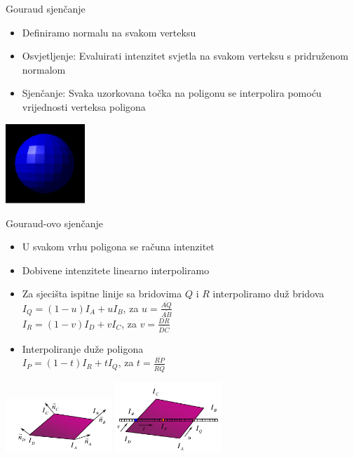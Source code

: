 \documentclass[9pt]{beamer}
\begin{document}
\begin{frame}{Gouraud sjenčanje}
	\begin{itemize}%
		\item Definiramo normalu na svakom verteksu
		\item Osvjetljenje: Evaluirati intenzitet svjetla na svakom verteksu s pridruženom normalom
		\item Sjenčanje: Svaka uzorkovana točka na poligonu se interpolira pomoću vrijednosti verteksa poligona
	\end{itemize}
	\begin{center}
		\includegraphics[width=3cm]{slike/shade_vs_light_01.png}
	\end{center}
\end{frame}
\begin{frame}{Gouraud-ovo sjenčanje}
	\begin{itemize}%
		\item U svakom vrhu poligona se računa intenzitet
		\item Dobivene intenzitete linearno interpoliramo
		\item Za sjecišta ispitne linije sa bridovima $Q$ i $R$ interpoliramo duž bridova\\
		$I_{Q}=(1-u)I_{A}+uI_{B}$, za $u=\frac{\overline{AQ}}{\overline{AB}}$\\
		$I_{R}=(1-v)I_{D}+vI_{C}$, za $v=\frac{\overline{DR}}{\overline{DC}}$
		\item Interpoliranje duže poligona \\
		$I_{P}=(1-t)I_{R}+tI_{Q}$, za $t=\frac{\overline{RP}}{\overline{RQ}}$
	\end{itemize}
	\begin{center}
		\includegraphics[width=4cm]{slike/09_gouraud1.png}
		\includegraphics[width=4cm]{slike/09_gouraud2.png}
	\end{center}
\end{frame}
\end{document}
